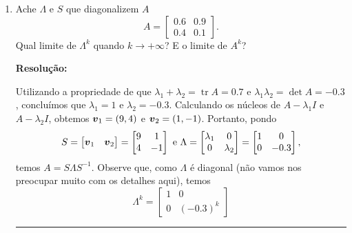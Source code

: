 \documentclass[leqno]{article}
\numberwithin{equation}{section}
\newenvironment{sol} 
{
    \vspace{4mm}
    \noindent\textbf{Resolução:}
    \strut\newline
    \smallskip
    \hspace{-3.5mm} 
} 
{\noindent\rule{4cm}{.1mm}}
\begin{document}
\begin{enumerate}
\begin{sol}
\end{sol}


\item Ache $\Lambda$ e $S$ que diagonalizem $A$
$$A = \begin{bmatrix}
0.6 & 0.9 \\
0.4 & 0.1
\end{bmatrix}.$$
Qual limite de $\Lambda^k$ quando $k \to +\infty$? E o limite de $A^k$?

\begin{sol}

    Utilizando a propriedade de que \( \lambda_{ 1 } + \lambda_{ 2 } = \operatorname{tr } A = 0.7 \) e \( \lambda_{ 1 } \lambda_{ 2 } = \det A = - 0.3 \), concluímos que \( \lambda_{ 1 } = 1 \) e \( \lambda_{ 2 } = - 0.3 \).
    Calculando os núcleos de \( A - \lambda_{ 1 } I \) e \( A - \lambda_{ 2 } I \), obtemos \( \boldsymbol{v}_{ 1 } = ( 9, 4 ) \) e \( \boldsymbol{v}_{ 2 } = ( 1, -1 ) \).
    Portanto, pondo
    \begin{equation*}
        S =
        \begin{bmatrix}
            \boldsymbol{v}_{ 1 } & \boldsymbol{v}_{ 2 }
        \end{bmatrix}
        =
        \begin{bmatrix}
            9 & 1 \\
            4 & -1
        \end{bmatrix}
        \text{ e }
        \Lambda =
        \begin{bmatrix}
            \lambda_{ 1 } & 0 \\
            0 & \lambda_{ 2 }
        \end{bmatrix}
        =
        \begin{bmatrix}
            1 & 0 \\
            0 & - 0.3
        \end{bmatrix}
    ,\end{equation*}
    temos \( A = S \Lambda S^{ -1 } \).
    Observe que, como \( \Lambda \) é diagonal (não vamos nos preocupar muito com os detalhes aqui), temos
    \begin{equation*}
        \Lambda^{ k } = 
        \begin{bmatrix}
            1 & 0 \\
            0 & (- 0.3)^{ k }
        \end{bmatrix}

\end{equation*}
\end{sol}
\end{enumerate}
\end{document}
